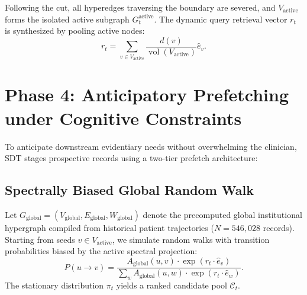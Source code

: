 \documentclass[ijds,dblanonrev]{informs4}
\DeclareMathOperator{\vol}{vol}
\begin{document}
Following the cut, all hyperedges traversing the boundary are severed, and $V_{\text{active}}$ forms the isolated active subgraph $G_t^{\text{active}}$. The dynamic query retrieval vector $r_t$ is synthesized by pooling active nodes:
\begin{equation}
  r_t = \sum_{v \in V_{\text{active}}} \frac{d(v)}{\vol(V_{\text{active}})} \hat{e}_v.
  \label{eq:retrieval_seed}
\end{equation}

\section{Phase 4: Anticipatory Prefetching under Cognitive Constraints}
\label{sec:phase4}

To anticipate downstream evidentiary needs without overwhelming the clinician, SDT stages prospective records using a two-tier prefetch architecture:

\subsection{Spectrally Biased Global Random Walk}
Let $G_{\text{global}} = (V_{\text{global}}, E_{\text{global}}, W_{\text{global}})$ denote the precomputed global institutional hypergraph compiled from historical patient trajectories ($N = 546{,}028$ records). Starting from seeds $v \in V_{\text{active}}$, we simulate random walks with transition probabilities biased by the active spectral projection:
\begin{equation}
  P(u \to v) = \frac{A_{\text{global}}(u, v) \cdot \exp(r_t \cdot \hat{e}_v)}{\sum_{w} A_{\text{global}}(u, w) \cdot \exp(r_t \cdot \hat{e}_w)}.
  \label{eq:biased_transition}
\end{equation}
The stationary distribution $\pi_t$ yields a ranked candidate pool $\mathcal{C}_t$.
\end{document}

